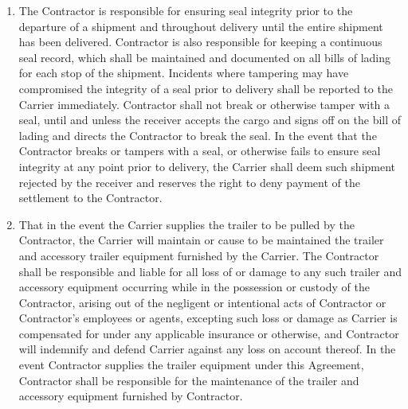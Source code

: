 \begin{enumerate}
    \item The Contractor is responsible for ensuring seal integrity prior
    to the departure of a shipment and throughout delivery until the entire
    shipment has been delivered. Contractor is also responsible for keeping
    a continuous seal record, which shall be maintained and documented on
    all bills of lading for each stop of the shipment. Incidents where
    tampering may have compromised the integrity of a seal prior to
    delivery shall be reported to the Carrier immediately. Contractor shall
    not break or otherwise tamper with a seal, until and unless the
    receiver accepts the cargo and signs off on the bill of lading and
    directs the Contractor to break the seal. In the event that the
    Contractor breaks or tampers with a seal, or otherwise fails to ensure
    seal integrity at any point prior to delivery, the Carrier shall deem
    such shipment rejected by the receiver and reserves the right to deny
    payment of the settlement to the Contractor.

    \item That in the event the Carrier supplies the trailer to be pulled
    by the Contractor, the Carrier will maintain or cause to be maintained
    the trailer and accessory trailer equipment furnished by the Carrier.
    The Contractor shall be responsible and liable for all loss of or
    damage to any such trailer and accessory equipment occurring while in
    the possession or custody of the Contractor, arising out of the
    negligent or intentional acts of Contractor or Contractor's employees
    or agents, excepting such loss or damage as Carrier is compensated for
    under any applicable insurance or otherwise, and Contractor will
    indemnify and defend Carrier against any loss on account thereof. In
    the event Contractor supplies the trailer equipment under this
    Agreement, Contractor shall be responsible for the maintenance of the
    trailer and accessory equipment furnished by Contractor.
\end{enumerate}